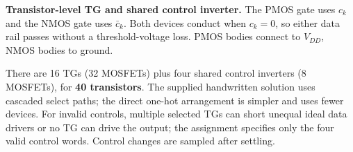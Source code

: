 \documentclass[11pt]{article}
\newcommand{\mos}[4]{\begin{scope}[shift={(#1,#2)}]
\draw (0,.24)--(0,-.24);
\draw (0,.20)--(.25,.20)--(.25,.5);
\draw (0,-.20)--(.25,-.20)--(.25,-.5);
\draw (-.16,.23)--(-.16,-.23);
\ifnum#4=1\draw (-.26,0) circle (.06);\draw (-.75,0)--(-.32,0);\else\draw (-.75,0)--(-.16,0);\fi
\node[anchor=east,font=\small] at (-.76,0) {$#3$};
\end{scope}}
\newcommand{\ground}[2]{\draw (#1,#2)--(#1,{#2-.12});\draw ({#1-.17},{#2-.12})--({#1+.17},{#2-.12});\draw ({#1-.11},{#2-.20})--({#1+.11},{#2-.20});}
\newcommand{\rail}[3]{\draw (#1,#2)--(#1,{#2+.15});\node[above,font=\small] at (#1,{#2+.15}) {$#3$};}
\newcommand{\outputnode}[3]{\fill (#1,#2) circle (.04);\draw (#1,#2)--({#1+.7},#2) node[right] {$#3$};}
\begin{document}
\begin{center}\end{center}

\textbf{Transistor-level TG and shared control inverter.} The PMOS gate uses $c_k$ and the NMOS gate uses $\bar c_k$. Both devices conduct when $c_k=0$, so either data rail passes without a threshold-voltage loss. PMOS bodies connect to $V_{DD}$, NMOS bodies to ground.
\begin{center}\end{center}
There are 16 TGs (32 MOSFETs) plus four shared control inverters (8 MOSFETs), for \textbf{40 transistors}. The supplied handwritten solution uses cascaded select paths; the direct one-hot arrangement is simpler and uses fewer devices. For invalid controls, multiple selected TGs can short unequal ideal data drivers or no TG can drive the output; the assignment specifies only the four valid control words. Control changes are sampled after settling.

\newpage
\end{document}
